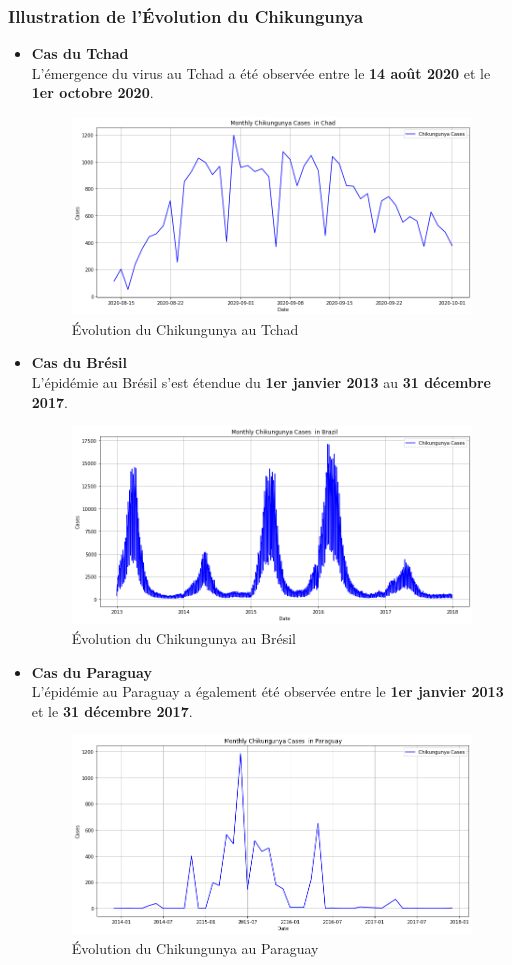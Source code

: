 \subsubsection*{Illustration de l'Évolution du Chikungunya}
\begin{itemize}
	\item \textbf{Cas du Tchad}\\
	L'émergence du virus au Tchad a été observée entre le \textbf{14 août 2020} et le \textbf{1er octobre 2020}.
	\begin{figure}[h!]
		\centering
		\includegraphics[width=0.6\linewidth]{images/case_chad}
		\caption[Évolution du Chikungunya au Tchad]{Évolution du Chikungunya au Tchad}
		\label{fig:casechad}
	\end{figure}
	
	\item \textbf{Cas du Brésil}\\
	L'épidémie au Brésil s'est étendue du \textbf{1er janvier 2013} au \textbf{31 décembre 2017}.
	\begin{figure}[h!]
		\centering
		\includegraphics[width=0.6\linewidth]{images/case_brazil}
		\caption[Évolution du Chikungunya au Brésil]{Évolution du Chikungunya au Brésil}
		\label{fig:casebrazil}
	\end{figure}
	
	\item \textbf{Cas du Paraguay}\\
	L'épidémie au Paraguay a également été observée entre le \textbf{1er janvier 2013} et le \textbf{31 décembre 2017}.
	\begin{figure}[h!]
		\centering
		\includegraphics[width=0.6\linewidth]{images/case_paraguay}
		\caption[Évolution du Chikungunya au Paraguay]{Évolution du Chikungunya au Paraguay}
		\label{fig:caseparaguay}
	\end{figure}
\end{itemize}

